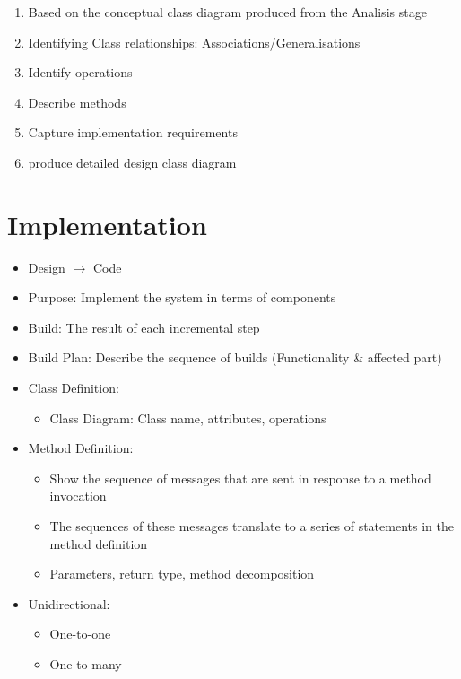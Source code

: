 \documentclass[12pt,openany]{book}
\begin{document}
\begin{itemize}
\begin{enumerate}
        \item Based on the conceptual class diagram produced from the Analisis stage
        \item Identifying Class relationships: Associations/Generalisations
        \item Identify operations
        \item Describe methods
        \item Capture implementation requirements
        \item produce detailed design class diagram
    \end{enumerate}
\end{itemize}

\section{Implementation}
\begin{itemize}
    \item Design $\rightarrow$ Code
    \item Purpose: Implement the system in terms of components
    \item Build: The result of each incremental step
    \item Build Plan: Describe the sequence of builds (Functionality \&  affected part)
    \item Class Definition:
    \begin{itemize}
        \item Class Diagram: Class name, attributes, operations
    \end{itemize}
    \item Method Definition:
    \begin{itemize}
        \item Show the sequence of messages that are sent in response to a method invocation
        \item The sequences of these messages translate to a series of statements in the method definition
        \item Parameters, return type, method decomposition
    \end{itemize}
    \item Unidirectional:
    \begin{itemize}
        \item One-to-one
        \item One-to-many 
    \end{itemize}
\end{itemize}
\end{document}
